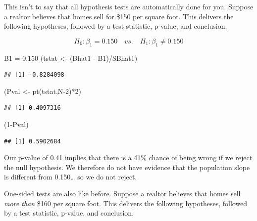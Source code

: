 \documentclass[
]{book}
\newenvironment{Shaded}{\begin{snugshade}}{\end{snugshade}}
\newcommand{\DecValTok}[1]{\textcolor[rgb]{0.00,0.00,0.81}{#1}}
\newcommand{\FloatTok}[1]{\textcolor[rgb]{0.00,0.00,0.81}{#1}}
\newcommand{\FunctionTok}[1]{\textcolor[rgb]{0.00,0.00,0.00}{#1}}
\newcommand{\NormalTok}[1]{#1}
\newcommand{\OtherTok}[1]{\textcolor[rgb]{0.56,0.35,0.01}{#1}}
\newcommand{\SpecialCharTok}[1]{\textcolor[rgb]{0.00,0.00,0.00}{#1}}
\begin{document}
This isn't to say that all hypothesis tests are automatically done for you. Suppose a realtor believes that homes sell for \$150 per square foot. This delivers the following hypotheses, followed by a test statistic, p-value, and conclusion.

\[H_0:\beta_1=0.150 \quad vs. \quad H_1:\beta_1\neq0.150\]

\begin{Shaded}
\begin{Highlighting}[]
\NormalTok{B1 }\OtherTok{=} \FloatTok{0.150}
\NormalTok{(tstat }\OtherTok{\textless{}{-}}\NormalTok{ (Bhat1 }\SpecialCharTok{{-}}\NormalTok{ B1)}\SpecialCharTok{/}\NormalTok{SBhat1)}
\end{Highlighting}
\end{Shaded}

\begin{verbatim}
## [1] -0.8284098
\end{verbatim}

\begin{Shaded}
\begin{Highlighting}[]
\NormalTok{(Pval }\OtherTok{\textless{}{-}} \FunctionTok{pt}\NormalTok{(tstat,N}\DecValTok{{-}2}\NormalTok{)}\SpecialCharTok{*}\DecValTok{2}\NormalTok{)}
\end{Highlighting}
\end{Shaded}

\begin{verbatim}
## [1] 0.4097316
\end{verbatim}

\begin{Shaded}
\begin{Highlighting}[]
\NormalTok{(}\DecValTok{1}\SpecialCharTok{{-}}\NormalTok{Pval)}
\end{Highlighting}
\end{Shaded}

\begin{verbatim}
## [1] 0.5902684
\end{verbatim}

Our p-value of 0.41 implies that there is a 41\% chance of being wrong if we reject the null hypothesis. We therefore do not have evidence that the population slope is different from 0.150\ldots{} so we do not reject.

One-sided tests are also like before. Suppose a realtor believes that homes sell \emph{more than} \$160 per square foot. This delivers the following hypotheses, followed by a test statistic, p-value, and conclusion.
\end{document}
